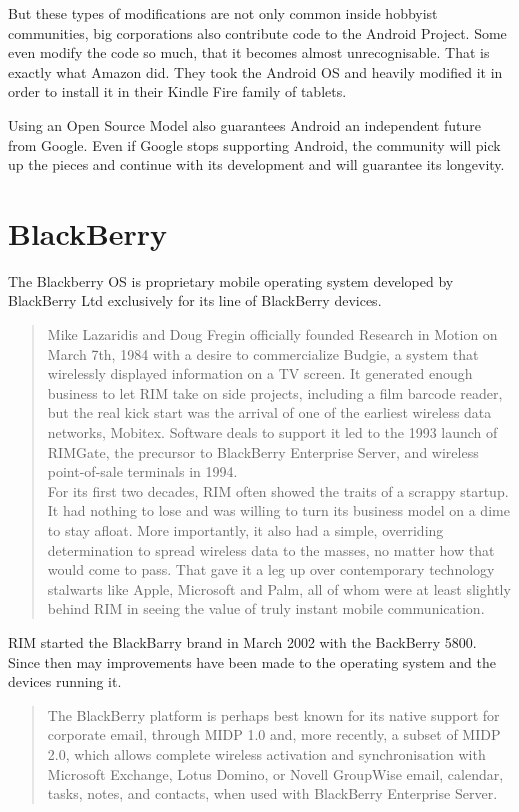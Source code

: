 But these types of modifications are not only common inside hobbyist communities, big corporations also contribute code to the Android Project. Some even modify the code so much, that it becomes almost unrecognisable. That is exactly what Amazon did. They took the Android OS and heavily modified it in order to install it in their Kindle Fire family of tablets.


Using an Open Source Model also guarantees Android an independent future from Google. Even if Google stops supporting  Android, the community will pick up the pieces and continue with its development and will guarantee its longevity.

\section{BlackBerry}
The Blackberry OS is proprietary mobile operating system developed by BlackBerry Ltd exclusively for its line of BlackBerry devices.

\begin{quotation}
Mike Lazaridis and Doug Fregin officially founded Research in Motion on March 7th, 1984 with a desire to commercialize Budgie, a system that wirelessly displayed information on a TV screen. It generated enough business to let RIM take on side projects, including a film barcode reader, but the real kick start was the arrival of one of the earliest wireless data networks, Mobitex. Software deals to support it led to the 1993 launch of RIMGate, the precursor to BlackBerry Enterprise Server, and wireless point-of-sale terminals in 1994.\\

For its first two decades, RIM often showed the traits of a scrappy startup. It had nothing to lose and was willing to turn its business model on a dime to stay afloat. More importantly, it also had a simple, overriding determination to spread wireless data to the masses, no matter how that would come to pass. That gave it a leg up over contemporary technology stalwarts like Apple, Microsoft and Palm, all of whom were at least slightly behind RIM in seeing the value of truly instant mobile communication.
\cite{fingas:2013}
\end{quotation}

RIM started the BlackBarry brand in March 2002 with the BackBerry 5800. Since then may improvements have been made to the operating system and the devices running it.
\begin{quotation}
The BlackBerry platform is perhaps best known for its native support for corporate email, through MIDP 1.0 and, more recently, a subset of MIDP 2.0, which allows complete wireless activation and synchronisation with Microsoft Exchange, Lotus Domino, or Novell GroupWise email, calendar, tasks, notes, and contacts, when used with BlackBerry Enterprise Server.
\cite{wikipedia:bb}
\end{quotation}

